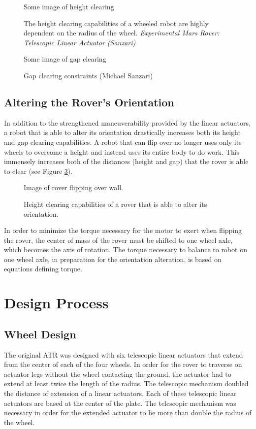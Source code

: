 \documentclass[11pt]{article}
\numberwithin{figure}{section}
\begin{document}
\begin{multicols}{2}
\begin{figure}[H]
Some image of height clearing
\caption{The height clearing capabilities of a wheeled robot are highly dependent on the radius of the wheel. \textit{Experimental Mars Rover: Telescopic Linear Actuator (Sanzari)}}
\label{fig:height-clearing}
\end{figure}

\begin{figure}[H]
Some image of gap clearing
\caption{Gap clearing constraints (Michael Sanzari)}
\label{fig:gap-clearing}
\end{figure}
\subsection{Altering the Rover's Orientation}
In addition to the strengthened maneuverability provided by the linear actuators, a robot that is able to alter its orientation drastically increases both its height and gap clearing capabilities. A robot that can flip over no longer uses only its wheels to overcome a height and instead uses its entire body to do work. This immensely increases both of the distances (height and gap) that the rover is able to clear (see Figure \ref{fig:flipping-over-wall}).

\begin{figure}[H]
Image of rover flipping over wall.
\caption{Height clearing capabilities of a rover that is able to alter its orientation.}
\label{fig:flipping-over-wall}
\end{figure}

In order to minimize the torque necessary for the motor to exert when flipping the rover, the center of mass of the rover must be shifted to one wheel axle, which becomes the axis of rotation. The torque necessary to balance to robot on one wheel axle, in preparation for the orientation alteration, is based on equations defining torque.

\section{Design Process}
\subsection{Wheel Design}
The original ATR was designed with six telescopic linear actuators that extend from the center of each of the four wheels. In order for the rover to traverse on actuator legs without the wheel contacting the ground, the actuator had to extend at least twice the length of the radius. The telescopic mechanism doubled the distance of extension of a linear actuators. Each of these telescopic linear actuators are based at the center of the plate. The telescopic mechanism was necessary in order for the extended actuator to be more than double the radius of the wheel. 


\end{multicols}
\end{document}
